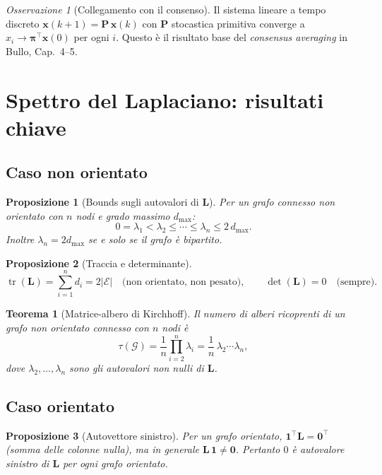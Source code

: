 \documentclass[a4paper,11pt]{article}
\theoremstyle{definition}
\theoremstyle{plain}
\newtheorem{thm}{Teorema}[section]
\newtheorem{prop}{Proposizione}[section]
\theoremstyle{remark}
\newtheorem{oss}{Osservazione}[section]
\newcommand{\mat}[1]{\mathbf{#1}}
\newcommand{\vect}[1]{\bm{#1}}
\newcommand{\ones}{\mathbf{1}}
\newcommand{\zeros}{\mathbf{0}}
\DeclareMathOperator{\tr}{tr}
\begin{document}
\begin{oss}[Collegamento con il consenso]
Il sistema lineare a tempo discreto $\vect{x}(k+1) = \mat{P}\,\vect{x}(k)$ con
$\mat{P}$ stocastica primitiva converge a $x_i \to \vect{\pi}^\top \vect{x}(0)$
per ogni $i$. Questo è il risultato base del \emph{consensus averaging} in Bullo,
Cap.\ 4--5.
\end{oss}

\section{Spettro del Laplaciano: risultati chiave}

\subsection{Caso non orientato}

\begin{prop}[Bounds sugli autovalori di $\mat{L}$]
Per un grafo connesso non orientato con $n$ nodi e grado massimo $d_{\max}$:
\[
  0 = \lambda_1 < \lambda_2 \leq \cdots \leq \lambda_n \leq 2\,d_{\max}.
\]
Inoltre $\lambda_n = 2d_{\max}$ se e solo se il grafo è bipartito.
\end{prop}

\begin{prop}[Traccia e determinante]
\[
  \tr(\mat{L}) = \sum_{i=1}^n d_i = 2|\mathcal{E}| \quad
  \text{(non orientato, non pesato)},
  \qquad
  \det(\mat{L}) = 0 \quad \text{(sempre).}
\]
\end{prop}

\begin{thm}[Matrice-albero di Kirchhoff]
Il numero di alberi ricoprenti di un grafo non orientato connesso con $n$ nodi è
\[
  \tau(\mathcal{G}) = \frac{1}{n} \prod_{i=2}^n \lambda_i
  = \frac{1}{n}\, \lambda_2 \cdots \lambda_n,
\]
dove $\lambda_2, \ldots, \lambda_n$ sono gli autovalori non nulli di $\mat{L}$.
\end{thm}

\subsection{Caso orientato}

\begin{prop}[Autovettore sinistro]
Per un grafo orientato, $\ones^\top \mat{L} = \zeros^\top$ (somma delle colonne nulla),
ma in generale $\mat{L}\,\ones \neq \zeros$.
Pertanto $0$ è autovalore sinistro di $\mat{L}$ per ogni grafo orientato.
\end{prop}
\end{document}
